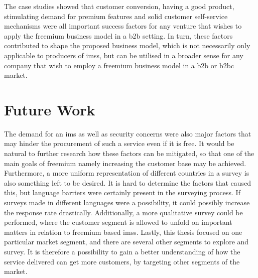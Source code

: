 The case studies showed that customer conversion, having a good product, stimulating demand for premium features and solid customer self-service mechanisms were all important success factors for any venture that wishes to apply the freemium business model in a \gls{b2b} setting. In turn, these factors contributed to shape the proposed business model, which is not necessarily only applicable to producers of \glspl{ims}, but can be utilised in a broader sense for any company that wish to employ a freemium business model in a \gls{b2b} or \gls{b2bc} market. 


\section{Future Work}
The demand for an \gls{ims} as well as security concerns were also major factors that may hinder the procurement of such a service even if it is free. It would be natural to further research how these factors can be mitigated, so that one of the main goals of freemium namely increasing the customer base may be achieved. Furthermore, a more uniform representation of different countries in a survey is also something left to be desired. It is hard to determine the factors that caused this, but language barriers were certainly present in the surveying process. If surveys made in different languages were a possibility, it could possibly increase the response rate drastically. Additionally, a more qualitative survey could be performed, where the customer segment is allowed to unfold on important matters in relation to freemium based \glspl{ims}. Lastly, this thesis focused on one particular market segment, and there are several other segments to explore and survey. It is therefore a possibility to gain a better understanding of how the service delivered can get more customers, by targeting other segments of the market. 